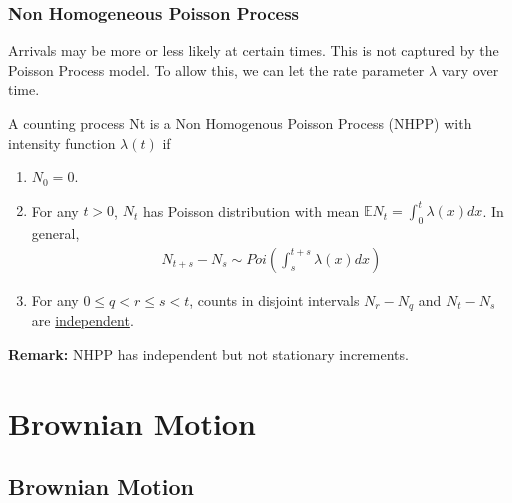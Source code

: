 \documentclass[11pt]{elegantbook}
\begin{document}
\subsection{Non Homogeneous Poisson Process}
Arrivals may be more or less likely at certain times. This is not captured by the Poisson Process model. To allow this, we can let the rate parameter $\lambda$ vary over time.
\begin{definition}
    A counting process Nt is a Non Homogenous Poisson Process (NHPP) with intensity function $\lambda(t)$ if
    \begin{enumerate}
        \item $N_0=0$.
        \item For any $t>0$, $N_t$ has Poisson distribution with mean $\mathbb{E}N_t=\int_0^t\lambda(x)dx$. In general,
        \begin{equation}
            \begin{aligned}
                N_{t+s}-N_s\sim Poi\left(\int_s^{t+s}\lambda(x)dx\right)
            \end{aligned}
            \nonumber
        \end{equation}
        \item For any $0\leq q< r\leq s< t$, counts in disjoint intervals $N_r-N_q$ and $N_t-N_s$ are \underline{independent}.
    \end{enumerate}
\end{definition}
\textbf{Remark:} NHPP has independent but not stationary increments.




\chapter{Brownian Motion}

\section{Brownian Motion}
\end{document}

